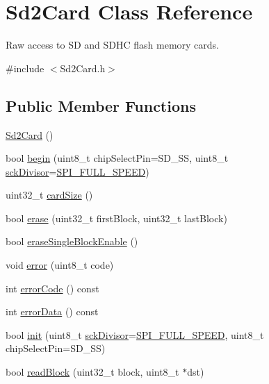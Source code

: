 \hypertarget{class_sd2_card}{}\section{Sd2\+Card Class Reference}
\label{class_sd2_card}


Raw access to SD and S\+D\+HC flash memory cards.  




{\ttfamily \#include $<$Sd2\+Card.\+h$>$}

\subsection*{Public Member Functions}
\begin{DoxyCompactItemize}
\item 
\hyperlink{class_sd2_card_a17c8713ae610106567679a8685696375}{Sd2\+Card} ()
\item 
bool \hyperlink{class_sd2_card_afa324d38d52e58389f8f70b64845429d}{begin} (uint8\+\_\+t chip\+Select\+Pin=S\+D\+\_\+\+SS, uint8\+\_\+t \hyperlink{class_sd2_card_a6bcfd1bf665bf4ff88a46c07741fac43}{sck\+Divisor}=\hyperlink{_sd2_card_8h_a6c091c07d1eb82a94b1c5738f720264b}{S\+P\+I\+\_\+\+F\+U\+L\+L\+\_\+\+S\+P\+E\+ED})
\item 
uint32\+\_\+t \hyperlink{class_sd2_card_a21ef1c5321041d4d73107b84e2db5189}{card\+Size} ()
\item 
bool \hyperlink{class_sd2_card_a2d73473118c5692e0f7d13db7da3570f}{erase} (uint32\+\_\+t first\+Block, uint32\+\_\+t last\+Block)
\item 
bool \hyperlink{class_sd2_card_aceacbe30077e41ab84a34e629a03bb33}{erase\+Single\+Block\+Enable} ()
\item 
void \hyperlink{class_sd2_card_af03e574590524f93a61641604e02f79f}{error} (uint8\+\_\+t code)
\item 
int \hyperlink{class_sd2_card_a3549d1878c0134171e399fd2d60b96f7}{error\+Code} () const 
\item 
int \hyperlink{class_sd2_card_a1736acdbf194c6a2fd923c0a5049c016}{error\+Data} () const 
\item 
bool \hyperlink{class_sd2_card_a634eb9af523f942d01cb374de1e05d7b}{init} (uint8\+\_\+t \hyperlink{class_sd2_card_a6bcfd1bf665bf4ff88a46c07741fac43}{sck\+Divisor}=\hyperlink{_sd2_card_8h_a6c091c07d1eb82a94b1c5738f720264b}{S\+P\+I\+\_\+\+F\+U\+L\+L\+\_\+\+S\+P\+E\+ED}, uint8\+\_\+t chip\+Select\+Pin=S\+D\+\_\+\+SS)
\item 
bool \hyperlink{class_sd2_card_a6b015ee1c94004b8b16639910e5a3466}{read\+Block} (uint32\+\_\+t block, uint8\+\_\+t $\ast$dst)

\end{DoxyCompactItemize}
